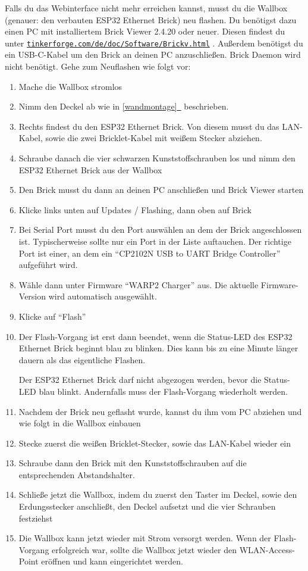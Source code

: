 \documentclass[a4paper,10pt]{article}
\newcommand{\hint}[1]{\begin{tcolorbox}[colback=boxgray,colframe=black,coltext=
white,title=Hinweis,left*=2mm,right*=2mm,boxsep=1mm,bottom=1mm,top=1mm]#1\end{tcolorbox}}
\newcommand*{\fullref}[1]{\hyperref[{#1}]{\ref*{#1}~\nameref*{#1}}}
\newcommand\rurl[2]{%
  \href{#1}{\nolinkurl{#2}}%
}
\begin{document}
\begin{multicols*}{2}
	Falls du das Webinterface nicht mehr erreichen kannst, musst du die Wallbox (genauer: den verbauten ESP32 Ethernet Brick) neu flashen.
	Du benötigst dazu einen PC mit installiertem Brick Viewer 2.4.20 oder neuer. Diesen findest du unter \rurl{https://www.tinkerforge.com/de/doc/Software/Brickv.html}{tinkerforge.com/de/doc/Software/Brickv.html}.
	Außerdem benötigst du ein USB-C-Kabel um den Brick an deinen PC anzuschließen. Brick Daemon wird nicht benötigt.
	Gehe zum Neuflashen wie folgt vor:
	\begin{enumerate}
		\item Mache die Wallbox stromlos
		\item Nimm den Deckel ab wie in \fullref{wandmontage} beschrieben.
		\item Rechts findest du den ESP32 Ethernet Brick. Von diesem musst du das LAN-Kabel, sowie die zwei Bricklet-Kabel mit weißem Stecker
		abziehen.
		\item Schraube danach die vier schwarzen Kunststoffschrauben los und nimm den ESP32 Ethernet Brick aus der Wallbox
		\item Den Brick musst du dann an deinen PC anschließen und Brick Viewer starten
		\item Klicke links unten auf Updates / Flashing, dann oben auf Brick
		\item Bei Serial Port musst du den Port auswählen an dem der Brick angeschlossen ist.
		      Typischerweise sollte nur ein Port in der Liste auftauchen.
		      Der richtige Port ist einer, an dem ein \enquote{CP2102N USB to UART Bridge Controller} aufgeführt wird.
		\item Wähle dann unter Firmware \enquote{WARP2 Charger} aus. Die aktuelle Firmware-Version wird automatisch ausgewählt.
		\item Klicke auf \enquote{Flash}
		\item Der Flash-Vorgang ist erst dann beendet, wenn die Status-LED des ESP32 Ethernet Brick beginnt blau zu blinken. Dies kann bis zu eine Minute länger dauern als das eigentliche Flashen.
		\hint{Der ESP32 Ethernet Brick darf nicht abgezogen werden, bevor die Status-LED blau blinkt. Andernfalls muss der Flash-Vorgang wiederholt werden.}
		\item Nachdem der Brick neu geflasht wurde, kannst du ihm vom PC abziehen und wie folgt in die Wallbox einbauen
		\item Stecke zuerst die weißen Bricklet-Stecker, sowie das LAN-Kabel wieder ein
		\item Schraube dann den Brick mit den Kunststoffschrauben auf die entsprechenden Abstandshalter. 
		\item Schließe jetzt die Wallbox, indem du zuerst den Taster im Deckel, sowie den Erdungsstecker anschließt, den Deckel aufsetzt und die vier Schrauben festziehst
		\item Die Wallbox kann jetzt wieder mit Strom versorgt werden. Wenn der Flash-Vorgang erfolgreich war, sollte die Wallbox jetzt wieder den WLAN-Access-Point eröffnen und kann eingerichtet werden.
	\end{enumerate}


\end{multicols*}
\end{document}
